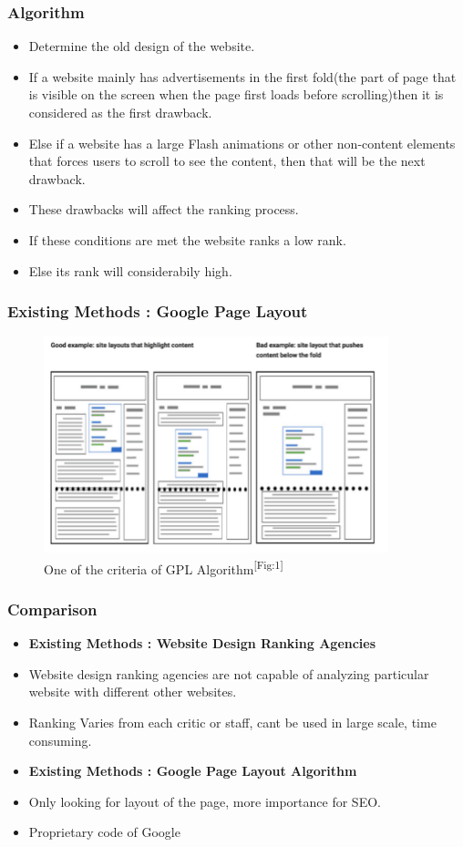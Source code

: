 \documentclass[11pt]{beamer}
\begin{document}
	\begin{frame}
	\frametitle{{Algorithm}}
	\begin{itemize}
		\item Determine the old design of the website.
		\item If a website mainly has advertisements in the first fold(the part of page that is visible on the screen when the page first loads before scrolling)then it is considered as the first drawback. 
		\item Else if a website has a large Flash animations or other non-content elements that forces users to scroll to see the content, then that will be the next drawback.  
		\item These drawbacks will affect the ranking process.
		\item If these conditions are met the website ranks a low rank.
		\item Else its rank will considerabily high.
		
	\end{itemize}
	
	\end{frame}
	\begin{frame}
	\frametitle{{Existing Methods : Google Page Layout}}
		\begin{figure}
		
		\includegraphics[width=10cm]{image/gpa.png}
		\caption{One of the criteria of GPL Algorithm\textsuperscript{[Fig:1]}}
		\label{fig1:gpa}
	\end{figure}
	\end{frame}
\begin{frame}
			\frametitle{{Comparison}}
	\begin{itemize}

		\item \textbf{Existing Methods : Website Design Ranking Agencies}
		\item Website design ranking agencies are not capable of analyzing particular website with different other websites.
		\item Ranking Varies from each critic or staff, cant be used in large scale, time consuming.
		\item \textbf{Existing Methods : Google Page Layout Algorithm}
		\item Only looking for layout of the page, more importance for SEO.
		\item Proprietary code of Google

	\end{itemize}
\end{frame}
\end{document}
